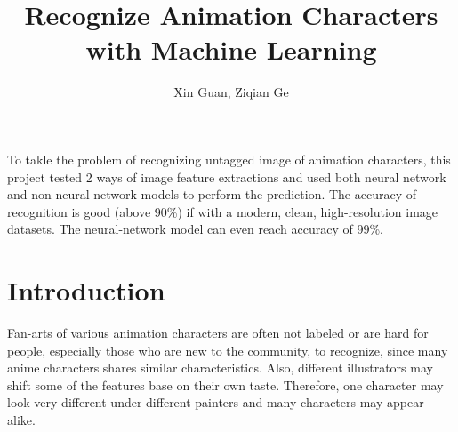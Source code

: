 \documentclass[11.5pt]{article}
\title{Recognize Animation Characters with Machine Learning}
\author{Xin Guan, Ziqian Ge}
\date{}
\begin{document}
    \maketitle

    \abstract
    To takle the problem of recognizing untagged image of animation characters, this project tested 2 ways of image feature extractions and used both neural network and non-neural-network models to perform the prediction. The accuracy of recognition is good (above 90\%) if with a modern, clean, high-resolution image datasets. The neural-network model can even reach accuracy of 99\%.
    

    \vspace{2mm}


    \section{Introduction}
    Fan-arts of various animation characters are often not labeled or are hard for people, especially those who are new to the community, to recognize, since many anime characters shares similar characteristics. Also, different illustrators may shift some of the features base on their own taste. Therefore, one character may look very different under different painters and many characters may appear alike.
\end{document}
